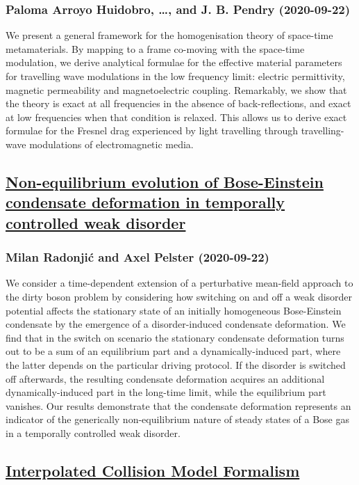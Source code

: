 {\subsubsection*{Paloma Arroyo Huidobro, \dots, and J. B. Pendry (2020-09-22)}
We present a general framework for the homogenisation theory of space-time
metamaterials. By mapping to a frame co-moving with the space-time modulation,
we derive analytical formulae for the effective material parameters for
travelling wave modulations in the low frequency limit: electric permittivity,
magnetic permeability and magnetoelectric coupling. Remarkably, we show that
the theory is exact at all frequencies in the absence of back-reflections, and
exact at low frequencies when that condition is relaxed. This allows us to
derive exact formulae for the Fresnel drag experienced by light travelling
through travelling-wave modulations of electromagnetic media.

\subsection*{\href{http://arxiv.org/abs/2009.10477v1}{Non-equilibrium evolution of Bose-Einstein condensate deformation in  temporally controlled weak disorder}}
\subsubsection*{Milan Radonjić and Axel Pelster (2020-09-22)}
We consider a time-dependent extension of a perturbative mean-field approach
to the dirty boson problem by considering how switching on and off a weak
disorder potential affects the stationary state of an initially homogeneous
Bose-Einstein condensate by the emergence of a disorder-induced condensate
deformation. We find that in the switch on scenario the stationary condensate
deformation turns out to be a sum of an equilibrium part and a
dynamically-induced part, where the latter depends on the particular driving
protocol. If the disorder is switched off afterwards, the resulting condensate
deformation acquires an additional dynamically-induced part in the long-time
limit, while the equilibrium part vanishes. Our results demonstrate that the
condensate deformation represents an indicator of the generically
non-equilibrium nature of steady states of a Bose gas in a temporally
controlled weak disorder.

\subsection*{\href{http://arxiv.org/abs/2009.10472v1}{Interpolated Collision Model Formalism}}
}
